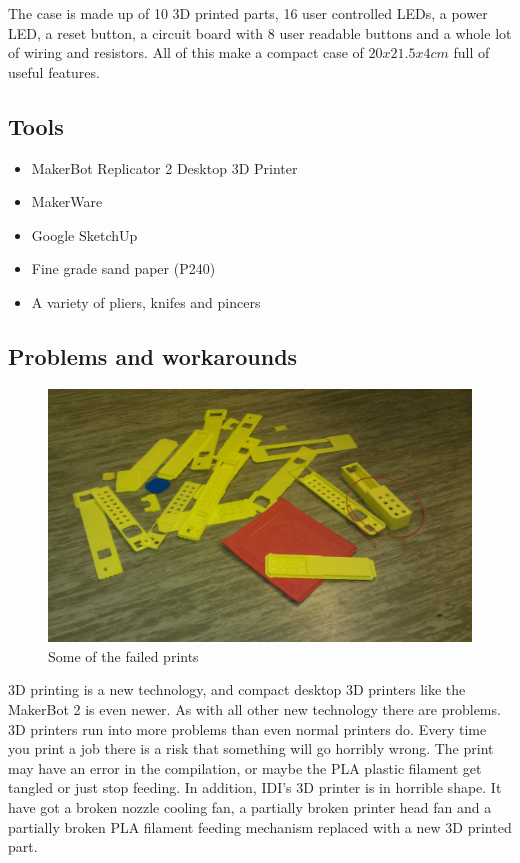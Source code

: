 The case is made up of 10 3D printed parts, 16 user controlled LEDs, a power LED, a reset button, a circuit board with 8 user readable buttons and a whole lot of wiring and resistors.
All of this make a compact case of $20 x 21.5 x 4 cm$ full of useful features.

\subsection{Tools}

\begin{itemize}
    \item MakerBot Replicator 2 Desktop 3D Printer
    \item MakerWare
    \item Google SketchUp
    \item Fine grade sand paper (P240)
    \item A variety of pliers, knifes and pincers
\end{itemize}

\subsection{Problems and workarounds}

\begin{figure}[H]
\includegraphics[width=\textwidth,keepaspectratio,clip]{additional-components/some-failed-prints.jpg}%
\caption{Some of the failed prints}
\end{figure}

3D printing is a new technology, and compact desktop 3D printers like the MakerBot 2 is even newer.
As with all other new technology there are problems.
3D printers run into more problems than even normal printers do.
Every time you print a job there is a risk that something will go horribly wrong.
The print may have an error in the compilation, or maybe the PLA plastic filament get tangled or just stop feeding.
In addition, IDI's 3D printer is in horrible shape.
It have got a broken nozzle cooling fan, a partially broken printer head fan and a partially broken PLA filament feeding mechanism replaced with a new 3D printed part.

